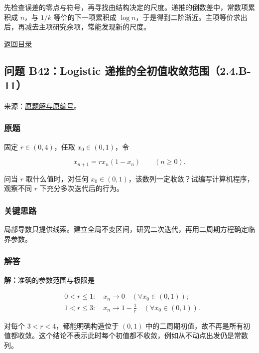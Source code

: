 \documentclass[11pt,a4paper]{article}
\begin{document}
先检查误差的零点与符号，再寻找由结构决定的尺度。递推的倒数差中，常数项累积成
\(n\)，与 \(1/k\) 等价的下一项累积成
\(\log n\)，于是得到二阶渐近。主项等价求出后，再减去主项研究余项，常能发现新的尺度。

\noindent\hyperref[contents]{返回目录}

\subsection{问题 B42：Logistic
递推的全初值收敛范围（2.4.B-11）}\label{ux95eeux9898-b42logistic-ux9012ux63a8ux7684ux5168ux521dux503cux6536ux655bux8303ux56f42.4.b-11}

来源：\href{https://zj139.github.io/math-notes/problems/0ce2ad9c1d045270806e755b/\#问题-b42}{原题解与原编号}。

\subsubsection{原题}\label{ux539fux9898-7}

固定 \(r\in(0,4)\)，任取 \(x_0\in(0,1)\)，令

\[
x_{n+1}=rx_n(1-x_n)\qquad(n\ge0).
\]

问当 \(r\) 取什么值时，对任何
\(x_0\in(0,1)\)，该数列一定收敛？试编写计算机程序，观察不同 \(r\)
下充分多次迭代后的行为。

\subsubsection{关键思路}\label{ux5173ux952eux601dux8def-7}

局部导数只提供线索。建立全局不变区间，研究二次迭代，再用二周期方程确定临界参数。

\subsubsection{解答}\label{ux89e3ux7b54-7}

\textbf{解：}准确的参数范围与极限是

\[
\boxed{
\begin{aligned}
&0<r\le1:\quad x_n\longrightarrow0\quad(\forall x_0\in(0,1));\\
&1<r\le3:\quad x_n\longrightarrow1-\frac1r\quad(\forall x_0\in(0,1)).
\end{aligned}}
\]

对每个 \(3<r<4\)，都能明确构造位于 \((0,1)\)
中的二周期初值，故不再是所有初值都收敛。这个结论不表示此时每个初值都不收敛，例如从不动点出发仍是常数列。
\end{document}
